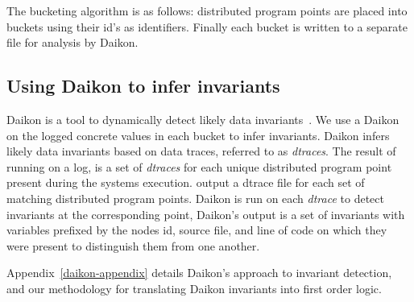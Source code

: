 The bucketing algorithm is as follows: distributed program points are
placed into buckets using their id's as identifiers.  Finally each
bucket is written to a separate file for analysis by Daikon.



\subsection{Using Daikon to infer invariants}

Daikon is a tool to dynamically detect likely data
invariants~\cite{Ernst07}.
%
We use a Daikon on the logged concrete values in each bucket to infer
invariants.
%
Daikon infers likely data invariants based on data traces, referred to
as \emph{dtraces}.  The result of running \dinv on a log, is a set of
\emph{dtraces} for each unique distributed program point present
during the systems execution.  \dinv output a dtrace file for each set
of matching distributed program points.  Daikon is run on each
\emph{dtrace} to detect invariants at the corresponding point,
Daikon's output is a set of invariants with variables prefixed by the
nodes id, source file, and line of code on which they were present to
distinguish them from one another. 



Appendix~\ref{daikon-appendix} details Daikon's approach to
invariant detection, and our methodology for translating Daikon
invariants into first order logic.


